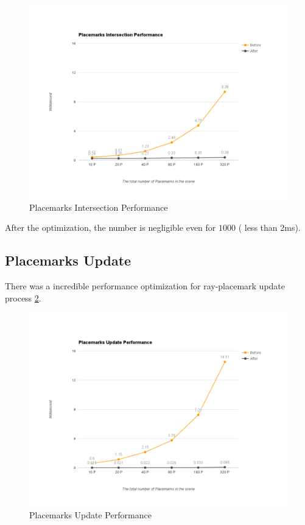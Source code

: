 \begin{figure}[H]
	\caption{Placemarks Intersection Performance}
	\label{fig:placemarks-intersection-performance}
	\centering
	\includegraphics[width=\textwidth, keepaspectratio]{Figures/placemarks-intersection-performance.png}
	\decoRule
\end{figure}

After the optimization, the number is negligible even for $1000$  ( less than 2ms).

\subsection{Placemarks Update}
\label{section:placemarks-update}


There was a incredible performance optimization for ray-placemark update process \ref{fig:placemarks-update-performance}. 

\begin{figure}[H]
	\caption{Placemarks Update Performance}
	\label{fig:placemarks-update-performance}
	\centering
	\includegraphics[width=\textwidth, keepaspectratio]{Figures/placemarks-update-performance.png}
	\decoRule
\end{figure}


